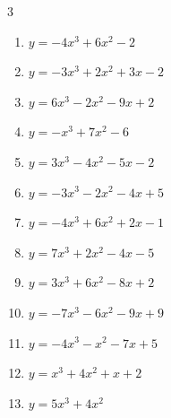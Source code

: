 \begin{multicols}{3}
\begin{enumerate}
  \item $y=-4x^{3}+6x^{2}-2$


  \item $y=-3x^{3}+2x^{2}+3x-2$


\columnbreak %

  \item $y=6x^{3}-2x^{2}-9x+2$


  \item $y=-x^{3}+7x^{2}-6$


  \item $y=3x^{3}-4x^{2}-5x-2$


  \item $y=-3x^{3}-2x^{2}-4x+5$


  \item $y=-4x^{3}+6x^{2}+2x-1$


  \item $y=7x^{3}+2x^{2}-4x-5$


  \item $y=3x^{3}+6x^{2}-8x+2$


  \item $y=-7x^{3}-6x^{2}-9x+9$


  \item $y=-4x^{3}-x^{2}-7x+5$


  \item $y=x^{3}+4x^{2}+x+2$


  \item $y=5x^{3}+4x^{2}$


\end{enumerate}
\end{multicols}
